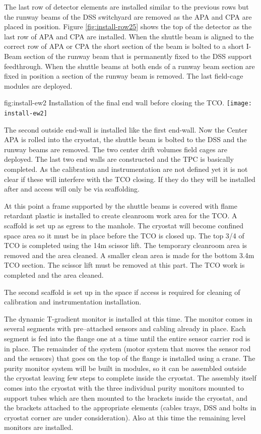 The last row of detector elements are installed similar to the previous rows but the runway beams of the DSS switchyard are removed as the APA and CPA are placed in position. Figure \ref{fig:install-row25} shows the top of the detector as the last row of APA and CPA are installed. When the shuttle beam is aligned to the correct row of APA or CPA the short section of the beam is bolted to a short I-Beam section of the runway beam that is permanently fixed to the DSS support feedthrough. When the shuttle beams at both ends of a runway beam section are fixed in position a section of the runway beam is removed. The last field-cage modules are deployed. 


\begin{dunefigure}{fig:install-ew2}
  {Installation of the final end wall before closing the TCO.}
\texttt{[image: install-ew2]}
\end{dunefigure}

The second outside end-wall is installed like the first end-wall. Now the Center APA is rolled into the cryostat, the shuttle beam is bolted to the DSS and the runway beams are removed. The two center drift volumes field cages are deployed. The last two end walls are constructed and the TPC is basically completed. As the calibration and instrumentation are not defined yet it is not clear if these will interfere with the TCO closing. If they do they will be installed after and access will only be via scaffolding. 

At this point a frame supported by the shuttle beams is covered with flame retardant plastic is installed to create cleanroom work area for the TCO.  A scaffold is set up as egress to the manhole. The cryostat will become confined space area so it must be in place before the TCO is closed up.  The top 3/4 of TCO is completed using the 14m scissor lift. The temporary cleanroom area is removed and the area cleaned. A smaller clean area is made for the bottom 3.4m TCO section.  The scissor lift must be removed at this part. The TCO work is completed and the area cleaned.

The second scaffold is set up in the space if access is required  for cleaning of calibration and instrumentation installation.

The dynamic T-gradient monitor is installed at this time. 
The monitor comes in several segments with pre--attached sensors and cabling already in place. Each segment is fed into the flange one at a time until the entire sensor carrier rod is in place. The remainder of the system (motor system that moves the sensor rod and the sensors) that goes on the top of the flange is installed using a crane. The purity monitor system will be built in modules, so it can be assembled outside the cryostat leaving few steps to complete inside the cryostat. 
The assembly itself comes into the cryostat with the three individual purity monitors mounted to support tubes which are then mounted to the brackets inside the cryostat, and the brackets attached to the appropriate elements (cables trays, DSS and bolts in cryostat corner are under consideration). Also at this time the remaining level monitors are installed.

